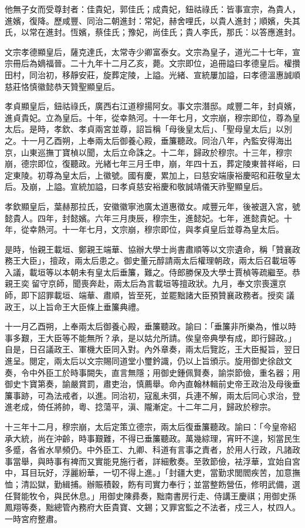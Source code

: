 \begin{pinyinscope}
他無子女而受尊封者：佳貴妃，郭佳氏；成貴妃，鈕祜祿氏：皆事宣宗，為貴人，進嬪，復降。歷咸豐、同治二朝進封：常妃，赫舍哩氏，以貴人進封；順嬪，失其氏，以常在進封。恆嬪，蔡佳氏；豫妃，尚佳氏；貴人李氏，那氏：以答應進封。

文宗孝德顯皇后，薩克達氏，太常寺少卿富泰女。文宗為皇子，道光二十七年，宣宗冊后為嫡福晉。二十九年十二月乙亥，薨。文宗即位，追冊謚曰孝德皇后。權攢田村，同治初，移靜安莊，旋葬定陵，上謚。光緒、宣統屢加謚，曰孝德溫惠誠順慈莊恪慎徽懿恭天贊聖顯皇后。

孝貞顯皇后，鈕祜祿氏，廣西右江道穆揚阿女。事文宗潛邸。咸豐二年，封貞嬪，進貞貴妃。立為皇后。十年，從幸熱河。十一年七月，文宗崩，穆宗即位，尊為皇太后。是時，孝欽、孝貞兩宮並尊，詔旨稱「母後皇太后」、「聖母皇太后」以別之。十一月乙酉朔，上奉兩太后御養心殿，垂簾聽政。同治八年，內監安得海出京，山東巡撫丁寶楨以聞，太后立命誅之。十二年，歸政於穆宗。十三年，穆宗崩，德宗即位，復聽政。光緒七年三月壬申，崩，年四十五，葬定陵東普祥峪，曰定東陵。初尊為皇太后，上徽號。國有慶，累加上，曰慈安端康裕慶昭和莊敬皇太后。及崩，上謚。宣統加謚，曰孝貞慈安裕慶和敬誠靖儀天祚聖顯皇后。

孝欽顯皇后，葉赫那拉氏，安徽徽寧池廣太道惠徵女。咸豐元年，後被選入宮，號懿貴人。四年，封懿嬪。六年三月庚辰，穆宗生，進懿妃。七年，進懿貴妃。十年，從幸熱河。十一年七月，文宗崩，穆宗即位，與孝貞皇后並尊為皇太后。

是時，怡親王載垣、鄭親王端華、協辦大學士尚書肅順等以文宗遺命，稱「贊襄政務王大臣」，擅政，兩太后患之。御史董元醇請兩太后權理朝政，兩太后召載垣等入議，載垣等以本朝未有皇太后垂簾，難之。侍郎勝保及大學士賈楨等疏繼至。恭親王奕留守京師，聞喪奔赴，兩太后為言載垣等擅政狀。九月，奉文宗喪還京師，即下詔罪載垣、端華、肅順，皆至死，並罷黜諸大臣預贊襄政務者。授奕議政王，以上旨命王大臣條上垂簾典禮。

十一月乙酉朔，上奉兩太后御養心殿，垂簾聽政。諭曰：「垂簾非所樂為，惟以時事多艱，王大臣等不能無所？承，是以姑允所請。俟皇帝典學有成，即行歸政。」自是，日召議政王、軍機大臣同入對。內外章奏，兩太后覽訖，王大臣擬旨，翌日進呈。閱定，兩太后以文宗賜同道堂小璽鈐識，仍以上旨頒示。旋用御史徐啟文奏，令中外臣工於時事闕失，直言無隱；用御史鍾佩賢奏，諭崇節儉，重名器；用御史卞寶第奏，諭嚴賞罰，肅吏治，慎薦舉。命內直翰林輯前史帝王政治及母後垂簾事跡，可為法戒者，以進。同治初，寇亂未弭，兵連不解，兩太后同心求治，登進老成，倚任將帥，粵、捻蕩平，滇、隴漸定。十二年二月，歸政於穆宗。

十三年十二月，穆宗崩，太后定策立德宗，兩太后復垂簾聽政。諭曰：「今皇帝紹承大統，尚在沖齡，時事艱難，不得已垂簾聽政。萬幾綜理，宵旰不遑，矧當民生多蹙，各省水旱頻仍。中外臣工、九卿、科道有言事之責者，於用人行政，凡諸政事當舉，與時事有裨而又實能見施行者，詳細敷奏。至敦節儉，袪浮華，宜始自宮中，耳目玩好，浮麗紛華，一切不得上進。」「封疆大吏，當勤求閭閻疾苦，加意撫恤；清訟獄，勤緝捕。辦賑積穀，飭有司實力奉行；並當整飭營伍，修明武備，選任賢能牧令，與民休息。」用御史陳彞奏，黜南書房行走、侍講王慶祺；用御史孫鳳翔等奏，黜總管內務府大臣貴寶、文錫；又罪宮監之不法者，戍三人，杖四人。一時宮府整肅。


\end{pinyinscope}
